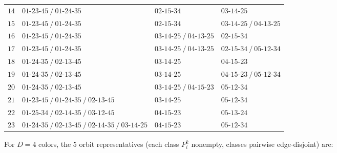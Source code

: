 \documentclass[11pt]{article}
\theoremstyle{definition}
\begin{document}
\begin{center}
{\begin{tabular}{clll}
$14$ & $01\text{-}23\text{-}45\ /\ 01\text{-}24\text{-}35$ & $02\text{-}15\text{-}34$ & $03\text{-}14\text{-}25$ \\
$15$ & $01\text{-}23\text{-}45\ /\ 01\text{-}24\text{-}35$ & $02\text{-}15\text{-}34$ & $03\text{-}14\text{-}25\ /\ 04\text{-}13\text{-}25$ \\
$16$ & $01\text{-}23\text{-}45\ /\ 01\text{-}24\text{-}35$ & $03\text{-}14\text{-}25\ /\ 04\text{-}13\text{-}25$ & $02\text{-}15\text{-}34$ \\
$17$ & $01\text{-}23\text{-}45\ /\ 01\text{-}24\text{-}35$ & $03\text{-}14\text{-}25\ /\ 04\text{-}13\text{-}25$ & $02\text{-}15\text{-}34\ /\ 05\text{-}12\text{-}34$ \\
$18$ & $01\text{-}24\text{-}35\ /\ 02\text{-}13\text{-}45$ & $03\text{-}14\text{-}25$ & $04\text{-}15\text{-}23$ \\
$19$ & $01\text{-}24\text{-}35\ /\ 02\text{-}13\text{-}45$ & $03\text{-}14\text{-}25$ & $04\text{-}15\text{-}23\ /\ 05\text{-}12\text{-}34$ \\
$20$ & $01\text{-}24\text{-}35\ /\ 02\text{-}13\text{-}45$ & $03\text{-}14\text{-}25\ /\ 04\text{-}15\text{-}23$ & $05\text{-}12\text{-}34$ \\
$21$ & $01\text{-}23\text{-}45\ /\ 01\text{-}24\text{-}35\ /\ 02\text{-}13\text{-}45$ & $03\text{-}14\text{-}25$ & $05\text{-}12\text{-}34$ \\
$22$ & $01\text{-}25\text{-}34\ /\ 02\text{-}14\text{-}35\ /\ 03\text{-}12\text{-}45$ & $04\text{-}15\text{-}23$ & $05\text{-}13\text{-}24$ \\
$23$ & $01\text{-}24\text{-}35\ /\ 02\text{-}13\text{-}45\ /\ 02\text{-}14\text{-}35\ /\ 03\text{-}14\text{-}25$ & $04\text{-}15\text{-}23$ & $05\text{-}12\text{-}34$ \\
\bottomrule
\end{tabular}}
\end{center}

For $D=4$ colors, the $5$ orbit representatives (each class $P_i^k$
nonempty, classes pairwise edge-disjoint) are:
\end{document}
